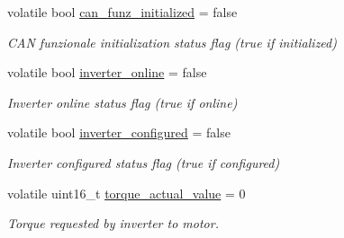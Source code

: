 \begin{DoxyCompactItemize}
\item 
\hypertarget{group___c_a_n__funzionale__group_ga8cd40fe9b965184307fe5886fcef6236}{volatile bool \hyperlink{group___c_a_n__funzionale__group_ga8cd40fe9b965184307fe5886fcef6236}{can\-\_\-funz\-\_\-initialized} = false}\label{group___c_a_n__funzionale__group_ga8cd40fe9b965184307fe5886fcef6236}

\begin{DoxyCompactList}\small\item\em C\-A\-N funzionale initialization status flag (true if initialized) \end{DoxyCompactList}\item 
\hypertarget{group___c_a_n__funzionale__group_ga392f688b1edd69f29b48818a5b9b19ae}{volatile bool \hyperlink{group___c_a_n__funzionale__group_ga392f688b1edd69f29b48818a5b9b19ae}{inverter\-\_\-online} = false}\label{group___c_a_n__funzionale__group_ga392f688b1edd69f29b48818a5b9b19ae}

\begin{DoxyCompactList}\small\item\em Inverter online status flag (true if online) \end{DoxyCompactList}\item 
\hypertarget{group___c_a_n__funzionale__group_ga979fff19d884e9a83eecc2309b36ad0c}{volatile bool \hyperlink{group___c_a_n__funzionale__group_ga979fff19d884e9a83eecc2309b36ad0c}{inverter\-\_\-configured} = false}\label{group___c_a_n__funzionale__group_ga979fff19d884e9a83eecc2309b36ad0c}

\begin{DoxyCompactList}\small\item\em Inverter configured status flag (true if configured) \end{DoxyCompactList}\item 
\hypertarget{group___c_a_n__funzionale__group_ga99ead1878913db87bc7cc808a8392e21}{volatile uint16\-\_\-t \hyperlink{group___c_a_n__funzionale__group_ga99ead1878913db87bc7cc808a8392e21}{torque\-\_\-actual\-\_\-value} = 0}\label{group___c_a_n__funzionale__group_ga99ead1878913db87bc7cc808a8392e21}

\begin{DoxyCompactList}\small\item\em Torque requested by inverter to motor. \end{DoxyCompactList}\end{DoxyCompactItemize}


